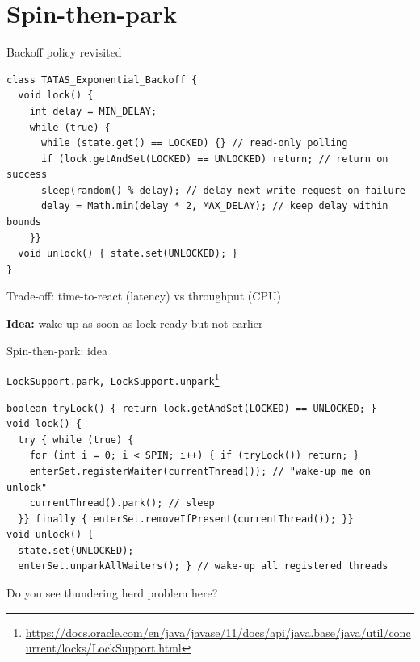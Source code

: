 \section{Spin-then-park}
\showTOC

\begin{frame}[fragile]{Backoff policy revisited}

\begin{verbatim}
class TATAS_Exponential_Backoff {  
  void lock() {
    int delay = MIN_DELAY;
    while (true) {
      while (state.get() == LOCKED) {} // read-only polling
      if (lock.getAndSet(LOCKED) == UNLOCKED) return; // return on success
      sleep(random() % delay); // delay next write request on failure
      delay = Math.min(delay * 2, MAX_DELAY); // keep delay within bounds    
    }}
  void unlock() { state.set(UNLOCKED); }
}
\end{verbatim}

\pause 
Trade-off: time-to-react (latency) vs throughput (CPU)

\pause 
\textbf{Idea:} wake-up as soon as lock ready but not earlier

\end{frame}


\begin{frame}[fragile]{Spin-then-park: idea}

\texttt{LockSupport.park, LockSupport.unpark}\footnote{\tiny\url{https://docs.oracle.com/en/java/javase/11/docs/api/java.base/java/util/concurrent/locks/LockSupport.html}}

\begin{verbatim}
boolean tryLock() { return lock.getAndSet(LOCKED) == UNLOCKED; }
void lock() {
  try { while (true) { 
    for (int i = 0; i < SPIN; i++) { if (tryLock()) return; }    
    enterSet.registerWaiter(currentThread()); // "wake-up me on unlock"
    currentThread().park(); // sleep 
  }} finally { enterSet.removeIfPresent(currentThread()); }}
void unlock() { 
  state.set(UNLOCKED); 
  enterSet.unparkAllWaiters(); } // wake-up all registered threads
\end{verbatim}

\pause
Do you see thundering herd problem here?

\end{frame}

